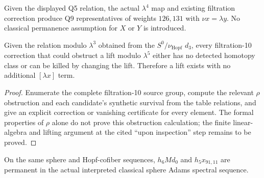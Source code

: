 \begin{lemma}
  \label{lem:near126-nu-extension-q5-q9}
  \notready
  Given the displayed Q5 relation, the actual $\lambda^4$ map and
  existing filtration correction produce Q9 representatives of weights
  $126,131$ with $\nu x=\lambda y$. No classical permanence assumption
  for $X$ or $Y$ is introduced.
\end{lemma}

\begin{proposition}
  \label{evidence:nu-extension-obstruction-vanishing}
  \notready
  Given the relation modulo $\lambda^3$ obtained from the
  $S^0/\nu_{\mathrm{Hopf}}$ $d_3$, every filtration-10 correction that could
  obstruct a lift modulo
  $\lambda^5$ either has no detected homotopy class or can be killed by changing
  the lift.  Therefore a lift exists with no additional $[\lambda x]$ term.
\end{proposition}

\begin{proof}
  Enumerate the complete filtration-10 source group, compute the relevant
  $\rho$ obstruction and each candidate's synthetic survival from the table
  relations, and give an explicit correction or vanishing certificate for
  every element. The formal properties of $\rho$ alone do not prove this
  obstruction calculation; the finite linear-algebra and lifting argument
  at the cited ``upon inspection'' step remains to be proved.
\end{proof}

\begin{proposition}
  \label{evidence:stem122-permanent}
  \notready
  On the same sphere and Hopf-cofiber sequences,
  $h_6Md_0$ and $h_5x_{91,11}$ are permanent in the actual interpreted
  classical sphere Adams spectral sequence.
\end{proposition}

